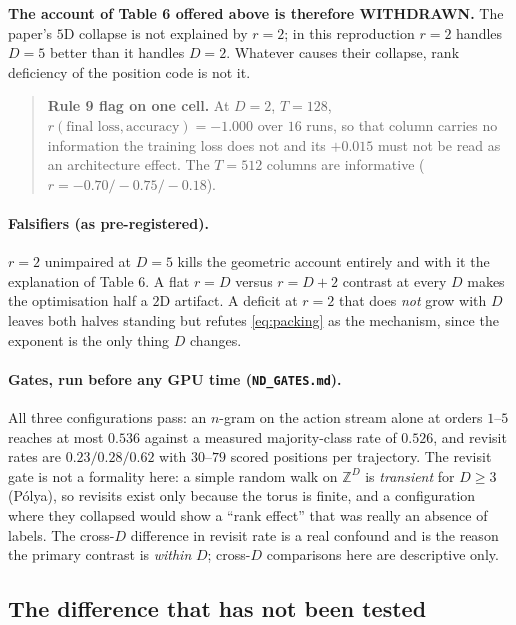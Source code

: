 \documentclass[11pt]{article}
\newcommand{\Z}{\mathbb{Z}}
\begin{document}
\textbf{The account of Table 6 offered above is therefore WITHDRAWN.} The paper's
$5$D collapse is not explained by $r=2$; in this reproduction $r=2$ handles $D=5$
better than it handles $D=2$. Whatever causes their collapse, rank deficiency of
the position code is not it.

\begin{quote}\small
\textbf{Rule 9 flag on one cell.} At $D=2$, $T=128$, $r(\text{final loss},
\text{accuracy}) = -1.000$ over $16$ runs, so that column carries no information
the training loss does not and its $+0.015$ must not be read as an architecture
effect. The $T{=}512$ columns are informative ($r = -0.70 / -0.75 / -0.18$).
\end{quote}

\paragraph{Falsifiers (as pre-registered).} $r=2$ unimpaired at $D=5$ kills the
geometric account entirely and with it the explanation of Table 6. A flat $r{=}D$ versus $r{=}D{+}2$
contrast at every $D$ makes the optimisation half a $2$D artifact. A deficit at
$r=2$ that does \emph{not} grow with $D$ leaves both halves standing but refutes
\eqref{eq:packing} as the mechanism, since the exponent is the only thing $D$
changes.

\paragraph{Gates, run before any GPU time (\texttt{ND\_GATES.md}).} All three
configurations pass: an $n$-gram on the action stream alone at orders $1$--$5$
reaches at most $0.536$ against a measured majority-class rate of $0.526$, and
revisit rates are $0.23/0.28/0.62$ with $30$--$79$ scored positions per
trajectory. The revisit gate is not a formality here: a simple random walk on
$\Z^{D}$ is \emph{transient} for $D \ge 3$ (P\'olya), so revisits exist only
because the torus is finite, and a configuration where they collapsed would show
a ``rank effect'' that was really an absence of labels. The cross-$D$ difference
in revisit rate is a real confound and is the reason the primary contrast is
\emph{within} $D$; cross-$D$ comparisons here are descriptive only.

\subsection{The difference that has not been tested}
\label{sec:place}
\end{document}
